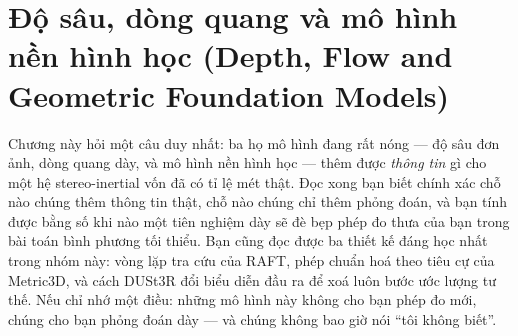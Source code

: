 \documentclass[../../deep_learning.tex]{subfiles}
\begin{document}
\chapter{Độ sâu, dòng quang và mô hình nền hình học (Depth, Flow and Geometric Foundation Models)}

\begin{tomtat}
Chương này hỏi một câu duy nhất: ba họ mô hình đang rất nóng --- độ sâu đơn ảnh, dòng quang dày, và mô hình nền hình học --- thêm được \emph{thông tin} gì cho một hệ stereo-inertial vốn đã có tỉ lệ mét thật. Đọc xong bạn biết chính xác chỗ nào chúng thêm thông tin thật, chỗ nào chúng chỉ thêm phỏng đoán, và bạn tính được bằng số khi nào một tiên nghiệm dày sẽ đè bẹp phép đo thưa của bạn trong bài toán bình phương tối thiểu. Bạn cũng đọc được ba thiết kế đáng học nhất trong nhóm này: vòng lặp tra cứu của RAFT, phép chuẩn hoá theo tiêu cự của Metric3D, và cách DUSt3R đổi biểu diễn đầu ra để xoá luôn bước ước lượng tư thế. Nếu chỉ nhớ một điều: những mô hình này không cho bạn phép đo mới, chúng cho bạn phỏng đoán dày --- và chúng không bao giờ nói ``tôi không biết''.
\end{tomtat}
\end{document}

